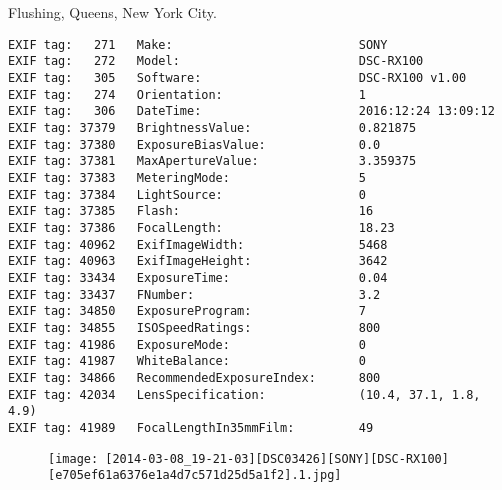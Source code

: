 \section{\protect{}}
\noindent Flushing, Queens, New York City.
\noindent
\begin{lstlisting}
EXIF tag:   271   Make:                          SONY
EXIF tag:   272   Model:                         DSC-RX100
EXIF tag:   305   Software:                      DSC-RX100 v1.00
EXIF tag:   274   Orientation:                   1
EXIF tag:   306   DateTime:                      2016:12:24 13:09:12
EXIF tag: 37379   BrightnessValue:               0.821875
EXIF tag: 37380   ExposureBiasValue:             0.0
EXIF tag: 37381   MaxApertureValue:              3.359375
EXIF tag: 37383   MeteringMode:                  5
EXIF tag: 37384   LightSource:                   0
EXIF tag: 37385   Flash:                         16
EXIF tag: 37386   FocalLength:                   18.23
EXIF tag: 40962   ExifImageWidth:                5468
EXIF tag: 40963   ExifImageHeight:               3642
EXIF tag: 33434   ExposureTime:                  0.04
EXIF tag: 33437   FNumber:                       3.2
EXIF tag: 34850   ExposureProgram:               7
EXIF tag: 34855   ISOSpeedRatings:               800
EXIF tag: 41986   ExposureMode:                  0
EXIF tag: 41987   WhiteBalance:                  0
EXIF tag: 34866   RecommendedExposureIndex:      800
EXIF tag: 42034   LensSpecification:             (10.4, 37.1, 1.8, 4.9)
EXIF tag: 41989   FocalLengthIn35mmFilm:         49

\end{lstlisting}
\clearpage
\begin{figure}
\raggedleft
\texttt{[image: [2014-03-08\_19-21-03][DSC03426][SONY][DSC-RX100][e705ef61a6376e1a4d7c571d25d5a1f2].1.jpg]}
\end{figure}


\clearpage
